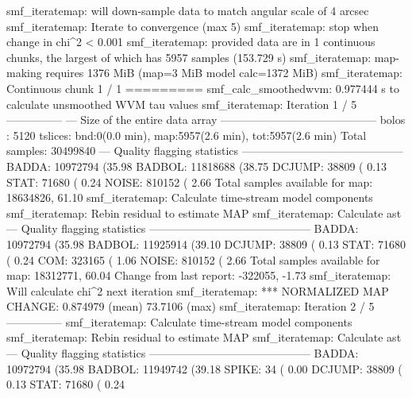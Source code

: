 \documentclass[11pt,oneside,chapters]{starlink}
\begin{document}
\begin{terminalv}
smf_iteratemap: will down-sample data to match angular scale of 4 arcsec
smf_iteratemap: Iterate to convergence (max 5)
smf_iteratemap: stop when change in chi^2 < 0.001
smf_iteratemap: provided data are in 1 continuous chunks, the largest of which
has 5957 samples (153.729 s)
smf_iteratemap: map-making requires 1376 MiB (map=3 MiB model calc=1372 MiB)
smf_iteratemap: Continuous chunk 1 / 1 =========
smf_calc_smoothedwvm: 0.977444 s to calculate unsmoothed WVM tau values
smf_iteratemap: Iteration 1 / 5 ---------------
--- Size of the entire data array ------------------------------------------
bolos  : 5120
tslices: bnd:0(0.0 min), map:5957(2.6 min), tot:5957(2.6 min)
Total samples: 30499840
--- Quality flagging statistics --------------------------------------------
 BADDA:   10972794 (35.98%
BADBOL:   11818688 (38.75%
DCJUMP:      38809 ( 0.13%
  STAT:      71680 ( 0.24%
 NOISE:     810152 ( 2.66%
Total samples available for map:   18634826, 61.10%
smf_iteratemap: Calculate time-stream model components
smf_iteratemap: Rebin residual to estimate MAP
smf_iteratemap: Calculate ast
--- Quality flagging statistics --------------------------------------------
 BADDA:   10972794 (35.98%
BADBOL:   11925914 (39.10%
DCJUMP:      38809 ( 0.13%
  STAT:      71680 ( 0.24%
   COM:     323165 ( 1.06%
 NOISE:     810152 ( 2.66%
Total samples available for map:   18312771, 60.04%
     Change from last report:    -322055, -1.73%
smf_iteratemap: Will calculate chi^2 next iteration
smf_iteratemap: *** NORMALIZED MAP CHANGE: 0.874979 (mean) 73.7106 (max)
smf_iteratemap: Iteration 2 / 5 ---------------
smf_iteratemap: Calculate time-stream model components
smf_iteratemap: Rebin residual to estimate MAP
smf_iteratemap: Calculate ast
--- Quality flagging statistics --------------------------------------------
 BADDA:   10972794 (35.98%
BADBOL:   11949742 (39.18%
 SPIKE:         34 ( 0.00%
DCJUMP:      38809 ( 0.13%
  STAT:      71680 ( 0.24%

\end{terminalv}
\end{document}
